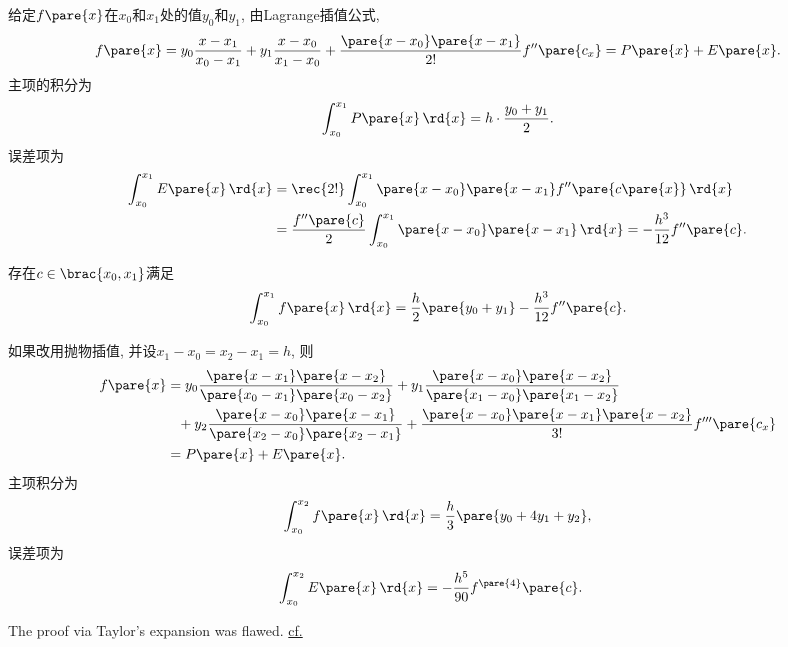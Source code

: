 \documentclass{ctexart}
\begin{document}
给定$f\pare{x}$在$x_0$和$x_1$处的值$y_0$和$y_1$, 由Lagrange插值公式,
\[ f\pare{x} = y_0 \frac{x-x_1}{x_0 - x_1} + y_1 \frac{x-x_0}{x_1-x_0} + \frac{\pare{x-x_0}\pare{x-x_1}}{2!}f''\pare{c_x} = P\pare{x} + E\pare{x}. \]
主项的积分为
\[ \int_{x_0}^{x_1} P\pare{x}\,\rd{x} = h\cdot \frac{y_0+y_1}{2}. \]
误差项为
\begin{align*}
    \int_{x_0}^{x_1} E\pare{x}\,\rd{x} &= \rec{2!}\int_{x_0}^{x_1}\pare{x-x_0}\pare{x-x_1}f''\pare{c\pare{x}}\,\rd{x}\\
    &= \frac{f''\pare{c}}{2}\int_{x_0}^{x_1} \pare{x-x_0}\pare{x-x_1}\,\rd{x} = -\frac{h^3}{12}f''\pare{c}.
\end{align*}
\begin{theorem}[梯形法则]
    存在$c\in\brac{x_0,x_1}$满足
    \[ \int_{x_0}^{x_1} f\pare{x}\,\rd{x} = \frac{h}{2}\pare{y_0+y_1} - \frac{h^3}{12}f''\pare{c}. \]
\end{theorem}
如果改用抛物插值, 并设$x_1 - x_0 = x_2 - x_1 = h$, 则
\begin{align*}
    f\pare{x} &= y_0 \frac{\pare{x-x_1}\pare{x-x_2}}{\pare{x_0-x_1}\pare{x_0-x_2}} + y_1 \frac{\pare{x-x_0}\pare{x-x_2}}{\pare{x_1-x_0}\pare{x_1-x_2}} \\
    &\phantom{= } + y_2\frac{\pare{x-x_0}\pare{x-x_1}}{\pare{x_2-x_0}\pare{x_2-x_1}} + \frac{\pare{x-x_0}\pare{x-x_1}\pare{x-x_2}}{3!}f'''\pare{c_x} \\
    &= P\pare{x} + E\pare{x}.
\end{align*}
主项积分为
\[ \int_{x_0}^{x_2}f\pare{x}\,\rd{x} = \frac{h}{3}\pare{y_0 + 4y_1 + y_2}, \]
误差项为
\begin{align*}
    \int_{x_0}^{x_2} E\pare{x}\,\rd{x} &= -\frac{h^5}{90}f^{\pare{4}}\pare{c}.
\end{align*}
\begin{remark}
    The proof via Taylor's expansion was flawed. \href{https://math.stackexchange.com/questions/1768667/combining-error-terms-in-simpsons-rule/1770264#1770264}{cf.}
\end{remark}
\end{document}
